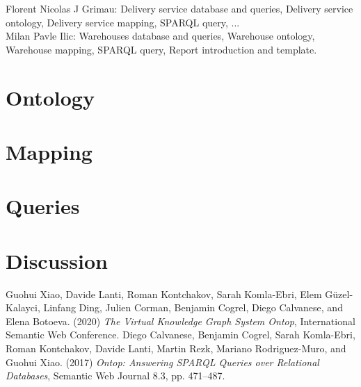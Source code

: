 \documentclass{article}
\begin{document}
\noindent Florent Nicolas J Grimau: Delivery service database and queries, Delivery service ontology, Delivery service mapping, SPARQL query, ...
\\

\noindent Milan Pavle Ilic: Warehouses database and queries, Warehouse ontology, Warehouse mapping, SPARQL query, Report introduction and template.



\section{Ontology}


\section{Mapping}


\section{Queries}


\section{Discussion}



\begin{thebibliography}{99}
Guohui Xiao, Davide Lanti, Roman Kontchakov, Sarah Komla-Ebri, Elem Güzel-Kalayci, Linfang Ding, Julien Corman, Benjamin Cogrel, Diego Calvanese, and Elena Botoeva. (2020) \emph{The Virtual Knowledge Graph System Ontop}, International Semantic Web Conference.
Diego Calvanese, Benjamin Cogrel, Sarah Komla-Ebri, Roman Kontchakov, Davide Lanti, Martin Rezk, Mariano Rodriguez-Muro, and Guohui Xiao. (2017) \emph{Ontop: Answering SPARQL Queries over Relational Databases}, Semantic Web Journal 8.3, pp. 471–487.
\end{thebibliography}
\end{document}
